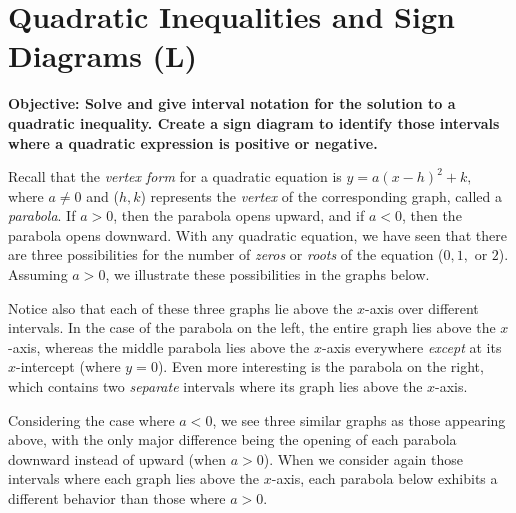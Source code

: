 \documentclass[12pt]{book}
\theoremstyle{definition}
\begin{document}
\section{Quadratic Inequalities and Sign Diagrams (L)}
{\bf Objective: Solve and give interval notation for the solution to a quadratic inequality.  Create a sign diagram to identify those intervals where a quadratic expression is positive or negative.}\par
Recall that the {\it vertex form} for a quadratic equation is $y=a(x-h)^2+k,$ where $a\neq 0$ and ($h,k$) represents the {\it vertex} of the corresponding graph, called a {\it parabola}.  If $a>0$, then the parabola opens upward, and if $a<0$, then the parabola opens downward.  With any quadratic equation, we have seen that there are three possibilities for the number of {\it zeros} or {\it roots} of the equation ($0,1,$ or $2$).  Assuming $a>0$, we illustrate these possibilities in the graphs below.
\begin{center}
\end{center}
Notice also that each of these three graphs lie above the $x$-axis over different intervals.  In the case of the parabola on the left, the entire graph lies above the $x$-axis, whereas the middle parabola lies above the $x$-axis everywhere {\it except} at its $x$-intercept (where $y=0$).  Even more interesting is the parabola on the right, which contains two {\it separate} intervals where its graph lies above the $x$-axis.\par
Considering the case where $a<0$, we see three similar graphs as those appearing above, with the only major difference being the opening of each parabola downward instead of upward (when $a>0$).  When we consider again those intervals where each graph lies above the $x$-axis, each parabola below exhibits a different behavior than those where $a>0$. 
\end{document}
